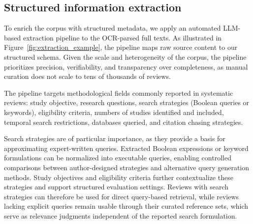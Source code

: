 \subsection*{Structured information extraction}
To enrich the corpus with structured metadata, we apply an automated LLM-based extraction pipeline to the OCR-parsed full texts. As illustrated in Figure~\ref{fig:extraction_example}, the pipeline maps raw source content to our structured schema. Given the scale and heterogeneity of the corpus, the pipeline prioritizes precision, verifiability, and transparency over completeness, as manual curation does not scale to tens of thousands of reviews.

The pipeline targets methodological fields commonly reported in systematic reviews: study objective, research questions, search strategies (Boolean queries or keywords), eligibility criteria, numbers of studies identified and included, temporal search restrictions, databases queried, and citation chasing strategies.

Search strategies are of particular importance, as they provide a basis for approximating expert-written queries. Extracted Boolean expressions or keyword formulations can be normalized into executable queries, enabling controlled comparisons between author-designed strategies and alternative query generation methods. Study objectives and eligibility criteria further contextualize these strategies and support structured evaluation settings. Reviews with search strategies can therefore be used for direct query-based retrieval, while reviews lacking explicit queries remain usable through their curated reference sets, which serve as relevance judgments independent of the reported search formulation.

